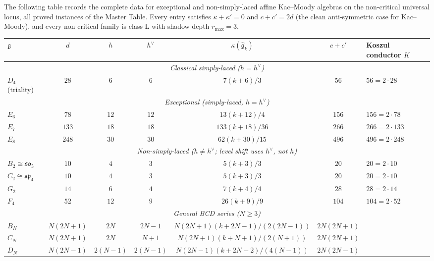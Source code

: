 \begin{remark}\label{rem:e8-complementarity}

The following table records the complete data for exceptional and
non-simply-laced affine Kac--Moody algebras on the non-critical
universal locus, all proved instances of the Master Table. Every entry
satisfies $\kappa + \kappa' = 0$ and $c + c' = 2d$ (the clean
anti-symmetric case for Kac--Moody), and every non-critical family is
class L with shadow depth $r_{\max} = 3$.
\begin{center}
\renewcommand{\arraystretch}{1.3}
\begin{tabular}{lcccccl}
\toprule
$\mathfrak{g}$ & $d$ & $h$ & $h^\vee$ & $\kappa(\widehat{\mathfrak{g}}_k)$ & $c+c'$ & Koszul conductor $K$ \\
\midrule
\multicolumn{7}{c}{\textit{Classical simply-laced ($h = h^\vee$)}} \\
$D_4$ (triality) & $28$ & $6$ & $6$ & $7(k+6)/3$ & $56$ & $56 = 2\cdot 28$ \\
\midrule
\multicolumn{7}{c}{\textit{Exceptional (simply-laced, $h = h^\vee$)}} \\
$E_6$ & $78$ & $12$ & $12$ & $13(k+12)/4$ & $156$ & $156 = 2\cdot 78$ \\
$E_7$ & $133$ & $18$ & $18$ & $133(k+18)/36$ & $266$ & $266 = 2\cdot 133$ \\
$E_8$ & $248$ & $30$ & $30$ & $62(k+30)/15$ & $496$ & $496 = 2\cdot 248$ \\
\midrule
\multicolumn{7}{c}{\textit{Non-simply-laced ($h \neq h^\vee$; level shift uses $h^\vee$, not $h$)}} \\
$B_2 \cong \mathfrak{so}_5$ & $10$ & $4$ & $3$ & $5(k+3)/3$ & $20$ & $20 = 2\cdot 10$ \\
$C_2 \cong \mathfrak{sp}_4$ & $10$ & $4$ & $3$ & $5(k+3)/3$ & $20$ & $20 = 2\cdot 10$ \\
$G_2$ & $14$ & $6$ & $4$ & $7(k+4)/4$ & $28$ & $28 = 2\cdot 14$ \\
$F_4$ & $52$ & $12$ & $9$ & $26(k+9)/9$ & $104$ & $104 = 2\cdot 52$ \\
\midrule
\multicolumn{7}{c}{\textit{General BCD series ($N \geq 3$)}} \\
$B_N$ & $N(2N{+}1)$ & $2N$ & $2N{-}1$ & $N(2N{+}1)(k{+}2N{-}1)/(2(2N{-}1))$ & $2N(2N{+}1)$ & \\
$C_N$ & $N(2N{+}1)$ & $2N$ & $N{+}1$ & $N(2N{+}1)(k{+}N{+}1)/(2(N{+}1))$ & $2N(2N{+}1)$ & \\
$D_N$ & $N(2N{-}1)$ & $2(N{-}1)$ & $2(N{-}1)$ & $N(2N{-}1)(k{+}2N{-}2)/(4(N{-}1))$ & $2N(2N{-}1)$ & \\
\bottomrule
\end{tabular}
\end{center}


\end{remark}
